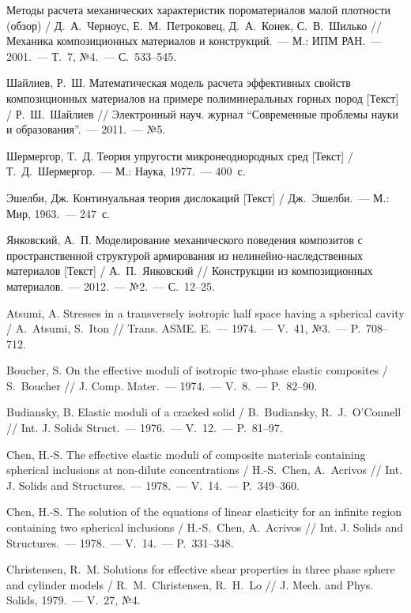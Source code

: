 \begin{biblist}{99}
Методы расчета механических характеристик пороматериалов малой плотности (обзор) 
/ Д.~А.~Черноус, Е.~М.~Петроковец, Д.~А.~Конек, С.~В.~Шилько 
// Механика композиционных материалов и конструкций.~--- М.: ИПМ РАН.~--- 2001.~--- Т.~7, №4.~--- С.~533--545.

Шайлиев, Р.~Ш. 
Математическая модель расчета эффективных свойств композиционных материалов на примере полиминеральных горных пород [Текст] 
/ Р.~Ш.~Шайлиев 
// Электронный науч. журнал ``Современные проблемы науки и образования''.~--- 2011.~--- №5.

Шермергор, Т.~Д. 
Теория упругости микронеоднородных сред [Текст] 
/ Т.~Д.~Шермергор.~--- М.: Наука, 1977.~--- 400~с.

Эшелби, Дж. 
Континуальная теория дислокаций [Текст] 
/ Дж.~Эшелби.~--- М.: Мир, 1963.~--- 247~с.

Янковский, А.~П. 
Моделирование механического поведения композитов с пространственной структурой армирования из нелинейно-наследственных материалов [Текст] 
/ А.~П.~Янковский 
// Конструкции из композиционных материалов.~--- 2012.~--- №2.~--- С.~12--25.

Atsumi, A. 
Stresses in a transversely isotropic half space having a spherical cavity 
/ A.~Atsumi, S.~Iton 
// Trans. ASME. E.~--- 1974.~--- V.~41, №3.~--- P.~708--712.

Boucher, S. 
On the effective moduli of isotropic two-phase elastic composites 
/ S.~Boucher 
// J. Comp. Mater.~--- 1974.~--- V.~8.~--- P.~82--90.

Budiansky, B. 
Elastic moduli of a cracked solid 
/ B.~Budiansky, R.~J.~O'Connell 
// Int. J. Solids Struct.~--- 1976.~--- V.~12.~--- P.~81--97.

Chen, H.-S. 
The effective elastic moduli of composite materials containing spherical inclusions at non-dilute concentrations 
/ H.-S.~Chen, A.~Acrivos 
// Int. J. Solids and Structures.~--- 1978.~--- V.~14.~--- P.~349--360.

Chen, H.-S. 
The solution of the equations of linear elasticity for an infinite region containing two spherical inclusions 
/ H.-S.~Chen, A.~Acrivos 
// Int. J. Solids and Structures.~--- 1978.~--- V.~14.~--- P.~331--348.

Christensen, R.~M. 
Solutions for effective shear properties in three phase sphere and cylinder models 
/ R.~M.~Christensen, R.~H.~Lo 
// J. Mech. and Phys. Solids, 1979.~--- V.~27, №4.


\end{biblist}
